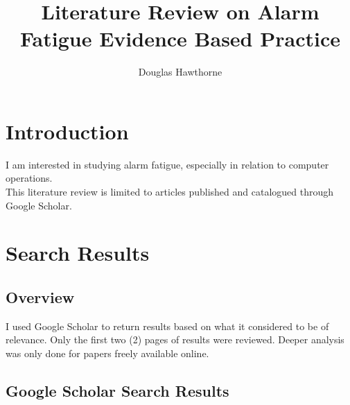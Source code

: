 \documentclass[]{report}
\title{Literature Review on Alarm Fatigue Evidence Based Practice}
\author{Douglas Hawthorne}
\begin{document}
	\maketitle
	
	\begin{abstract}
		
	\end{abstract}

	\tableofcontents
	\listoftables
	
	\chapter{Introduction}
	I am interested in studying alarm fatigue, especially in relation to computer operations.\\
	
	This literature review is limited to articles published and catalogued through Google Scholar.\\
	
	\chapter{Search Results}
	
	\section{Overview}
	
	I used Google Scholar to return results based on what it considered to be of relevance. Only the first two (2) pages of results were reviewed. Deeper analysis was only done for papers freely available online.
	
	\section{Google Scholar Search Results}
	
\end{document}
